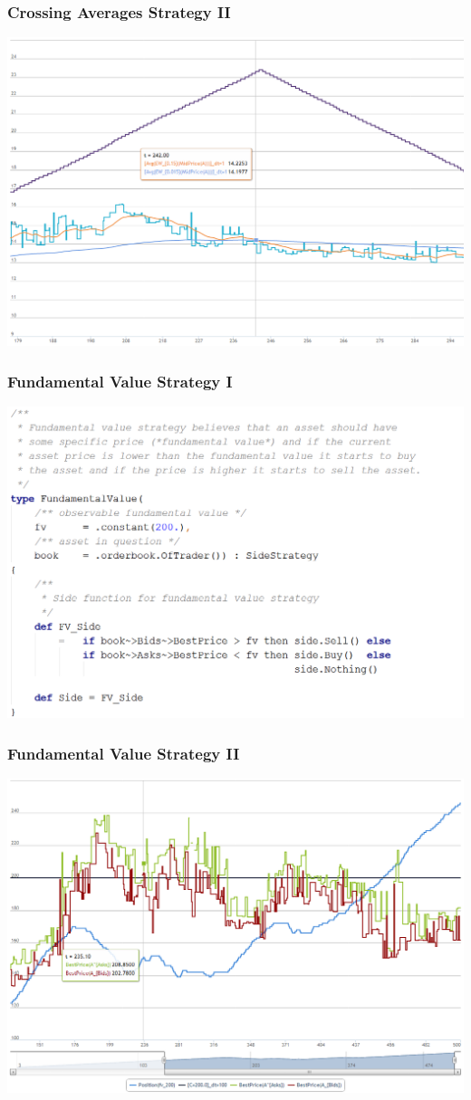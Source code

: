 \documentclass{beamer}
\begin{document}
\begin{frame}
\frametitle{Crossing Averages Strategy II}
\includegraphics[width=1\linewidth]{twoaverages.png}
\end{frame}
\begin{frame}
\frametitle{Fundamental Value Strategy I}
\includegraphics[width=1\linewidth]{fundamentalvalue_strategy.png}
\end{frame}
\begin{frame}
\frametitle{Fundamental Value Strategy II}
\includegraphics[width=1\linewidth]{fundamentalvalue.png}
\end{frame}
\end{document}
